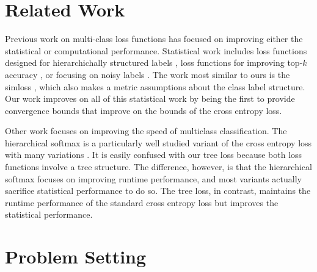 \documentclass[twoside]{article}
\begin{document}

\section{Related Work}
\label{sec:related}

Previous work on multi-class loss functions has focused on improving either the statistical or computational performance.
Statistical work includes loss functions designed for hierarchichally structured labels \citep{cesa2006incremental,wu2017hierarchical},
loss functions for improving top-$k$ accuracy \citep{lapin2016loss},
or focusing on noisy labels \citep{sukhbaatar2014training,zhang2018generalized}.
The work most similar to ours is the simloss \citep{Kobs2020SimLossCS},
which also makes a metric assumptions about the class label structure.
Our work improves on all of this statistical work by being the first to provide convergence bounds that improve on the bounds of the cross entropy loss.

Other work focuses on improving the speed of multiclass classification.
The hierarchical softmax \citep{morin2005hierarchical} is a particularly well studied variant of the cross entropy loss with many variations \citep[e.g.][]{Peng2017IncrementallyLT,Jiang2017ExplorationOT,Yang2017OptimizeHS,Mohammed2018EffectivenessOH}.
It is easily confused with our tree loss because both loss functions involve a tree structure.
The difference, however, is that the hierarchical softmax focuses on improving runtime performance,
and most variants actually sacrifice statistical performance to do so.
The tree loss, in contrast, maintains the runtime performance of the standard cross entropy loss but improves the statistical performance.



\section{Problem Setting}
\label{sec:problem}
\end{document}
